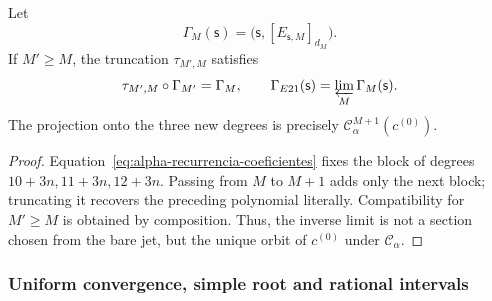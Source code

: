\begin{proposition}
\label{prop:alpha-naturalidad-recurrencia-explicita}
Let
\[
 \Gamma_M(\mathsf s)
 =\bigl(\mathsf s,[E_{\mathsf s,M}]_{d_M}\bigr).
\]
If \(M'\geq M\), the truncation \(\tau_{M',M}\) satisfies
\begin{equation}
 \tau_{M',M}\circ\Gamma_{M'}=\Gamma_M,
 \qquad
 \Gamma_{E21}(\mathsf s)=\varprojlim_M\Gamma_M(\mathsf s).
 \label{eq:alpha-naturalidad-explicita}
\end{equation}
The projection onto the three new degrees is precisely
\(\mathcal C_\alpha^{M+1}(c^{(0)})\).
\end{proposition}

\begin{proof}
Equation~\eqref{eq:alpha-recurrencia-coeficientes} fixes the block of
degrees \(10+3n,11+3n,12+3n\). Passing from \(M\) to \(M+1\) adds only
the next block; truncating it recovers the preceding polynomial literally.
Compatibility for \(M'\geq M\) is obtained by composition. Thus, the
inverse limit is not a section chosen from the bare jet, but the
unique orbit of \(c^{(0)}\) under \(\mathcal C_\alpha\).
\end{proof}

\subsubsection{Uniform convergence, simple root and rational intervals}
\label{subsec:alpha-cotas-completas-rev08}


